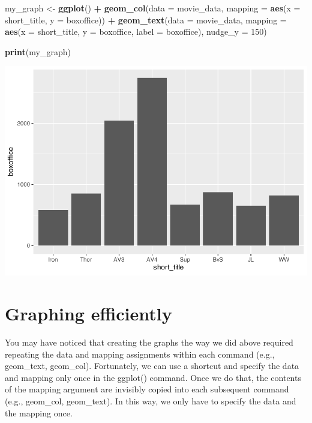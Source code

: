\documentclass[
]{krantz}
\makeatletter
\newenvironment{Shaded}{\begin{snugshade}}{\end{snugshade}}
\newcommand{\DataTypeTok}[1]{\textcolor[rgb]{0.27,0.27,0.27}{#1}}
\newcommand{\DecValTok}[1]{\textcolor[rgb]{0.06,0.06,0.06}{#1}}
\newcommand{\KeywordTok}[1]{\textcolor[rgb]{0.27,0.27,0.27}{\textbf{#1}}}
\newcommand{\NormalTok}[1]{#1}
\newcommand{\OperatorTok}[1]{\textcolor[rgb]{0.43,0.43,0.43}{\textbf{#1}}}
\newcommand{\StringTok}[1]{\textcolor[rgb]{0.5,0.5,0.5}{#1}}
\newenvironment{kframe}{%
\medskip{}
\setlength{\fboxsep}{.8em}
 \def\at@end@of@kframe{}%
 \ifinner\ifhmode%
  \def\at@end@of@kframe{\end{minipage}}%
  \begin{minipage}{\columnwidth}%
 \fi\fi%
 \def\FrameCommand##1{\hskip\@totalleftmargin \hskip-\fboxsep
 \colorbox{shadecolor}{##1}\hskip-\fboxsep
     \hskip-\linewidth \hskip-\@totalleftmargin \hskip\columnwidth}%
 \MakeFramed {\advance\hsize-\width
   \@totalleftmargin\z@ \linewidth\hsize
   \@setminipage}}%
 {\par\unskip\endMakeFramed%
 \at@end@of@kframe}
\renewenvironment{Shaded}{\begin{kframe}}{\end{kframe}}
\makeatother
\begin{document}
\begin{Shaded}
\begin{Highlighting}[]
\NormalTok{my_graph <-}\StringTok{ }\KeywordTok{ggplot}\NormalTok{() }\OperatorTok{+}
\StringTok{  }\KeywordTok{geom_col}\NormalTok{(}\DataTypeTok{data =}\NormalTok{ movie_data,}
           \DataTypeTok{mapping =} \KeywordTok{aes}\NormalTok{(}\DataTypeTok{x =}\NormalTok{ short_title, }
                         \DataTypeTok{y =}\NormalTok{ boxoffice)) }\OperatorTok{+}
\StringTok{  }\KeywordTok{geom_text}\NormalTok{(}\DataTypeTok{data =}\NormalTok{ movie_data, }
           \DataTypeTok{mapping =} \KeywordTok{aes}\NormalTok{(}\DataTypeTok{x =}\NormalTok{ short_title, }
                         \DataTypeTok{y =}\NormalTok{ boxoffice, }
                         \DataTypeTok{label =}\NormalTok{ boxoffice),}
           \DataTypeTok{nudge_y =} \DecValTok{150}\NormalTok{)}

\KeywordTok{print}\NormalTok{(my_graph)}
\end{Highlighting}
\end{Shaded}

\includegraphics[width=0.65\linewidth]{bookdown_files/figure-latex/unnamed-chunk-110-1}

\hypertarget{graphing-efficiently}{%
\section{Graphing efficiently}\label{graphing-efficiently}}

You may have noticed that creating the graphs the way we did above required repeating the data and mapping assignments within each command (e.g., geom\_text, geom\_col). Fortunately, we can use a shortcut and specify the data and mapping only once in the ggplot() command. Once we do that, the contents of the mapping argument are invisibly copied into each subsequent command (e.g., geom\_col, geom\_text). In this way, we only have to specify the data and the mapping once.
\end{document}
